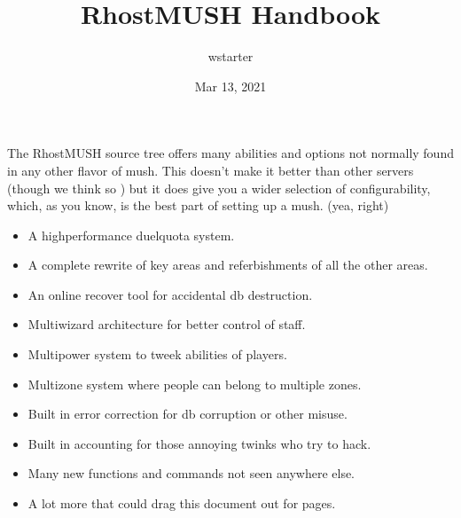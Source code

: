 \documentclass[letterpaper,10pt,english]{sphinxmanual}
\title{RhostMUSH Handbook}
\date{Mar 13, 2021}
\author{wstarter}
\begin{document}
\pagestyle{empty}
\sphinxmaketitle
\pagestyle{plain}
\sphinxtableofcontents
\pagestyle{normal}
\label{\detokenize{index::doc}}


\sphinxAtStartPar
The RhostMUSH source tree offers many abilities and options
not normally found in any other flavor of mush.  This doesn’t
make it better than other servers (though we think so )
but it does give you a wider selection of configurability,
which, as you know, is the best part of setting up a mush.
(yea, right)
\begin{itemize}
\item {} 
\sphinxAtStartPar
A high\sphinxhyphen{}performance duel\sphinxhyphen{}quota system.

\item {} 
\sphinxAtStartPar
A complete rewrite of key areas and referbishments of all the other areas.

\item {} 
\sphinxAtStartPar
An on\sphinxhyphen{}line recover tool for accidental db destruction.

\item {} 
\sphinxAtStartPar
Multi\sphinxhyphen{}wizard architecture for better control of staff.

\item {} 
\sphinxAtStartPar
Multi\sphinxhyphen{}power system to tweek abilities of players.

\item {} 
\sphinxAtStartPar
Multi\sphinxhyphen{}zone system where people can belong to multiple zones.

\item {} 
\sphinxAtStartPar
Built in error correction for db corruption or other misuse.

\item {} 
\sphinxAtStartPar
Built in accounting for those annoying twinks who try to hack.

\item {} 
\sphinxAtStartPar
Many new functions and commands not seen anywhere else.

\item {} 
\sphinxAtStartPar
A lot more that could drag this document out for pages.

\end{itemize}
\end{document}
